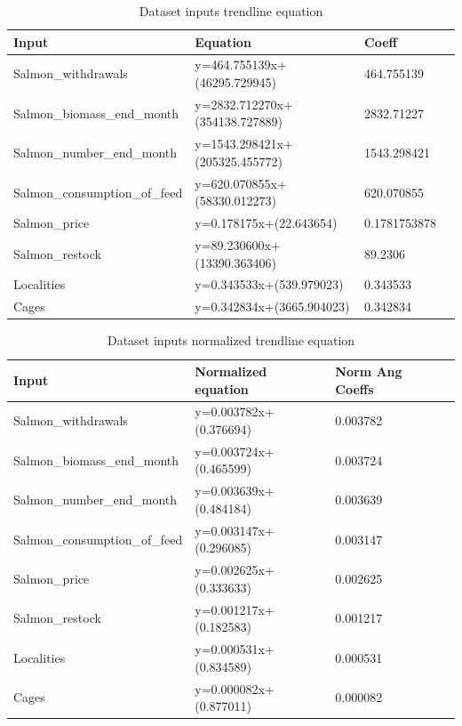 \begin{table}[ht] 
	\centering
    \begin{tabular}{ | l | l | l | p{5cm} |}
        \hline
        Input 								& Equation 							& Coeff			\\ \hline
          	Salmon\_withdrawals 			& y=464.755139x+(46295.729945) 		& 464.755139 	\\ \hline
          	Salmon\_biomass\_end\_month 	& y=2832.712270x+(354138.727889) 	& 2832.71227 	\\ \hline
          	Salmon\_number\_end\_month 		& y=1543.298421x+(205325.455772)	& 1543.298421 	\\ \hline
          	Salmon\_consumption\_of\_feed 	& y=620.070855x+(58330.012273) 		& 620.070855	\\ \hline
           	Salmon\_price 			& y=0.178175x+(22.643654)			& 0.1781753878 		\\ \hline
          	Salmon\_restock 				& y=89.230600x+(13390.363406)		& 89.2306 		\\ \hline
 			Localities 						& y=0.343533x+(539.979023) 			& 0.343533		\\ \hline
  			Cages 							& y=0.342834x+(3665.904023) 		& 0.342834 		\\ \hline
    \end{tabular} 
    \caption{Dataset inputs trendline equation}
    \label{table: trendline2} 
\end{table}
\begin{table}[ht] 
	\centering
    \begin{tabular}{ | l | l | l | p{5cm} |}
        \hline
        Input 							& Normalized equation 	& Norm Ang Coeffs	\\ \hline
          	Salmon\_withdrawals 		& y=0.003782x+(0.376694)& 0.003782			\\ \hline
          	Salmon\_biomass\_end\_month & y=0.003724x+(0.465599)& 0.003724			\\ \hline
          	Salmon\_number\_end\_month 	& y=0.003639x+(0.484184)& 0.003639			\\ \hline
          	Salmon\_consumption\_of\_feed & y=0.003147x+(0.296085)& 0.003147		\\ \hline
           	Salmon\_price 		& y=0.002625x+(0.333633)
& 0.002625			\\ \hline
          	Salmon\_restock 			& y=0.001217x+(0.182583)& 0.001217			\\ \hline
 			Localities 					& y=0.000531x+(0.834589)& 0.000531			\\ \hline
  			Cages 						& y=0.000082x+(0.877011)& 0.000082			\\ \hline
    \end{tabular} 
    \caption{Dataset inputs normalized trendline equation}
    \label{table: norm_trendline} 
\end{table}

